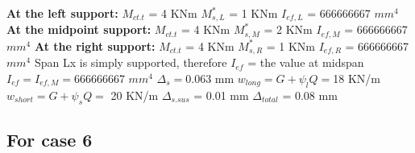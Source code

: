 \documentclass{article}%
\begin{document}
%
\newline%
\newline%
%
\textbf{At the left support:}%
\newline%
\newline%
%
$M_{ct.t}$ = 4 KNm%
\newline%
%
$M_{s,L}^{*}$ = 1 KNm%
\newline%
%
$I_{ef,L}$ = 666666667 $mm^{4}$%
\newline%
\newline%
%
\textbf{At the midpoint support:}%
\newline%
\newline%
%
$M_{ct.t}$ = 4 KNm%
\newline%
%
$M_{s,M}^{*}$ = 2 KNm%
\newline%
%
$I_{ef,M}$ = 666666667 $mm^{4}$%
\newline%
\newline%
%
\textbf{At the right support:}%
\newline%
\newline%
%
$M_{ct.t}$ = 4 KNm%
\newline%
%
$M_{s,R}^{*}$ = 1 KNm%
\newline%
%
$I_{ef,R}$ = 666666667 $mm^{4}$%
\newline%
\newline%
%
Span Lx is simply supported, therefore $I_{ef}$ = the value at midspan%
\newline%
\newline%
%
$I_{ef} = I_{ef,M} = $666666667 $ mm^{4}$%
\newline%
\newline%
%
$\Delta_{s} =$0.063 mm%
\newline%
\newline%
%
$w_{long} = G + \psi_{l}Q = $18 KN/m%
\newline%
%
$w_{short} = G + \psi_{s}Q = $ 20 KN/m%
\newline%
\newline%
%
$\Delta_{s.sus}$ = 0.01 mm%
\newline%
\newline%
%
$\Delta_{total}$ = 0.08 mm%
\subsection*{For case 6}%
\label{subsec:Forcase6}%
\end{document}
